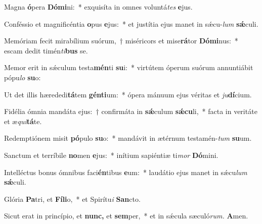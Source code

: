 \item Magna \textbf{ó}pera \textbf{Dó}\textbf{mi}ni:~* exquisíta in omnes voluntá\tinyhspace\textit{tes} \textbf{e}jus.
\item Conféssio et magnificéntia \textbf{o}pus \textbf{e}jus:~* et justítia ejus manet in sǽcu-\textit{lum} \textbf{sǽ}culi.
\item Memóriam fecit mirabílium suórum,~† miséricors et mise\textbf{rá}tor \textbf{Dó}\textbf{mi}nus:~* escam dedit timén\tinyhspace\textit{ti}\textbf{bus} se.
\item Memor erit in sǽculum testa\textbf{mén}ti \textbf{su}i:~* virtútem óperum suórum annuntiábit pópu\tinyhspace\textit{lo} \textbf{su}o:
\item Ut det illis hærededi\textbf{tá}tem \textbf{gén}\textbf{ti}um:~* ópera mánuum ejus véritas et \textit{ju}\textbf{dí}cium.
\item Fidélia ómnia mandáta ejus:~† confirmáta in \textbf{sǽ}culum \textbf{sǽ}\textbf{cu}li,~* facta in veritáte et æ\tinyhspace\textit{qui}\textbf{tá}te.
\item Redemptiónem misit \textbf{pó}pulo \textbf{su}o:~* mandávit in ætérnum testamén-\textit{tum} \textbf{su}um.
\item Sanctum et terríbile \textbf{no}men \textbf{e}jus:~* inítium sapiéntiæ ti\tinyhspace\textit{mor} \textbf{Dó}mini.
\item Intelléctus bonus ómnibus faci\textbf{én}tibus \textbf{e}um:~* laudátio ejus manet in sǽcu\tinyhspace\textit{lum} \textbf{sǽ}culi.
\item Glória \textbf{Pa}tri, et \textbf{Fí}\textbf{li}o,~* et Spirítu\tinyhspace\textit{i} \textbf{San}cto.
\item Sicut erat in princípio, et \textbf{nunc,} et \textbf{sem}per,~* et in sǽcula sæculó\textit{rum.} \textbf{A}men.
